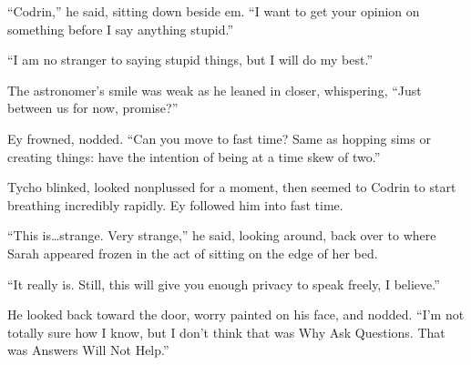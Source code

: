 ``Codrin,'' he said, sitting down beside em. ``I want to get your opinion on something before I say anything stupid.''

``I am no stranger to saying stupid things, but I will do my best.''

The astronomer's smile was weak as he leaned in closer, whispering, ``Just between us for now, promise?''

Ey frowned, nodded. ``Can you move to fast time? Same as hopping sims or creating things: have the intention of being at a time skew of two.''

Tycho blinked, looked nonplussed for a moment, then seemed to Codrin to start breathing incredibly rapidly. Ey followed him into fast time.

``This is\ldots strange. Very strange,'' he said, looking around, back over to where Sarah appeared frozen in the act of sitting on the edge of her bed.

``It really is. Still, this will give you enough privacy to speak freely, I believe.''

He looked back toward the door, worry painted on his face, and nodded. ``I'm not totally sure how I know, but I don't think that was Why Ask Questions. That was Answers Will Not Help.''
